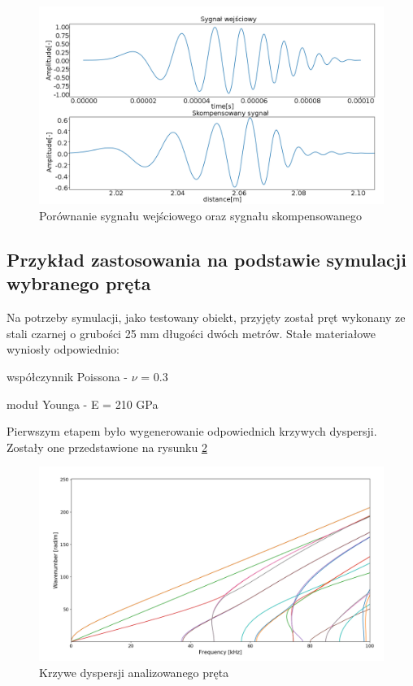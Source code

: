 \begin{figure}[h]
\centering
\includegraphics[width=14cm]{Zdjecia/4/Wilcoxporownanie}
\caption{Porównanie sygnału wejściowego oraz sygnału skompensowanego}
\label{fig:willast}
\end{figure}

\subsection{Przykład zastosowania na podstawie symulacji wybranego pręta}

Na potrzeby symulacji, jako testowany obiekt, przyjęty został pręt wykonany ze stali czarnej o grubości 25 mm długości dwóch metrów. Stałe materiałowe wyniosły odpowiednio: 

współczynnik Poissona - $\nu$ = 0.3 

moduł Younga - E = 210 GPa 

Pierwszym etapem było wygenerowanie odpowiednich krzywych dyspersji. Zostały one przedstawione na rysunku \ref{fig:krzywestalowe}
\begin{figure}[h]
\centering
\includegraphics[width=14cm]{Zdjecia/4/krzywestalowe}
\caption{Krzywe dyspersji analizowanego pręta}
\label{fig:krzywestalowe}
\end{figure}

